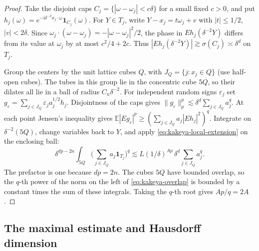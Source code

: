 \begin{proof}
Take the disjoint caps \(C_j=\{|\omega-\omega_j|<c\delta\}\) for a
small fixed \(c>0\), and put
\(h_j(\omega)=e^{-\mathrm i\delta^{-2}x_j\cdot\omega}\mathbf1_{C_j}(\omega)\).
For \(Y\in T_j\), write \(Y-x_j=t\omega_j+v\) with \(|t|\le1/2\),
\(|v|<2\delta\). Since
\(\omega_j\cdot(\omega-\omega_j)=-|\omega-\omega_j|^2/2\),
the phase in \(Eh_j(\delta^{-2}Y)\) differs from its value at
\(\omega_j\) by at most \(c^2/4+2c\). Thus
\(|Eh_j(\delta^{-2}Y)|\gtrsim\sigma(C_j)\asymp\delta^d\) on \(T_j\).

Group the centers by the unit lattice cubes \(Q\), with
\(J_Q=\{j:x_j\in Q\}\) (use half-open cubes). The tubes in this group
lie in the concentric cube \(5Q\), so their dilates all lie in a
ball of radius \(C_n\delta^{-2}\). For independent random signs
\(\varepsilon_j\) set \(g_\varepsilon=\sum_{j\in J_Q}
\varepsilon_j a_j^{1/2}h_j\). Disjointness of the caps gives
\(\|g_\varepsilon\|_p^p\lesssim\delta^d\sum_{j\in J_Q}a_j^q\).
At each point Jensen's inequality gives
\(\mathbb E|Eg_\varepsilon|^p\ge
(\sum_{j\in J_Q}a_j|Eh_j|^2)^q\).
Integrate on \(\delta^{-2}(5Q)\), change variables back to \(Y\),
and apply \eqref{eq:kakeya-local-extension} on the enclosing ball:
\[
 \delta^{dp-2n}\int_{5Q}
       \Big(\sum_{j\in J_Q}a_j\mathbf1_{T_j}\Big)^q
 \lesssim L(1/\delta)^{Ap}\,\delta^d\sum_{j\in J_Q}a_j^q .
\]
The prefactor is one because \(dp=2n\). The cubes \(5Q\) have bounded
overlap, so the \(q\)-th power of the norm on the left of
\eqref{eq:kakeya-overlap} is bounded by a constant times the sum of
these integrals. Taking the \(q\)-th root gives \(Ap/q=2A\).
\end{proof}

\subsection{The maximal estimate and Hausdorff dimension}

